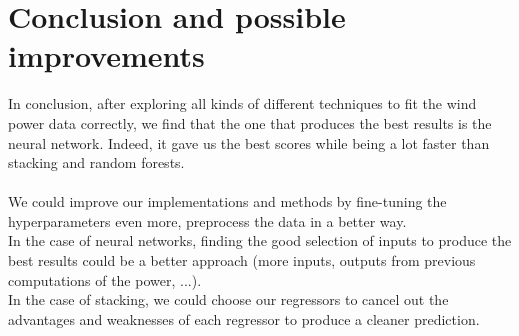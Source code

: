 \section{Conclusion and possible improvements}
In conclusion, after exploring all kinds of different techniques to fit the wind power data correctly, we find that the one that produces the best results is the neural network. Indeed, it gave us the best scores while being a lot faster than stacking and random forests.
\\\\
We could improve our implementations and methods by fine-tuning the hyperparameters even more, preprocess the data in a better way. 
\\In the case of neural networks, finding the good selection of inputs to produce the best results could be a better approach (more inputs, outputs from previous computations of the power, ...). 
\\In the case of stacking, we could choose our regressors to cancel out the advantages and weaknesses of each regressor to produce a cleaner prediction.
